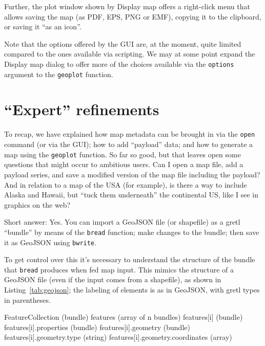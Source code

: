 \documentclass{article}
\begin{document}
Further, the plot window shown by \textsf{Display map} offers a
right-click menu that allows saving the map (as PDF, EPS, PNG or EMF),
copying it to the clipboard, or saving it ``as an icon''.

Note that the options offered by the GUI are, at the moment, quite
limited compared to the ones available via scripting. We may at some
point expand the \textsf{Display map} dialog to offer more of the
choices available via the \texttt{options} argument to the
\texttt{geoplot} function.

\section{``Expert'' refinements}
\label{sec:expert}

To recap, we have explained how map metadata can be brought in via the
\texttt{open} command (or via the GUI); how to add ``payload'' data;
and how to generate a map using the \texttt{geoplot} function. So far
so good, but that leaves open some questions that might occur to
ambitious users.  Can I open a map file, add a payload series, and
save a modified version of the map file including the payload? And in
relation to a map of the USA (for example), is there a way to include
Alaska and Hawaii, but ``tuck them underneath'' the continental US,
like I see in graphics on the web?

Short answer: Yes. You can import a GeoJSON file (or shapefile) as a
gretl ``bundle'' by means of the \texttt{bread} function; make changes
to the bundle; then save it as GeoJSON using \texttt{bwrite}.

To get control over this it's necessary to understand the structure of
the bundle that \texttt{bread} produces when fed map input. This
mimics the structure of a GeoJSON file (even if the input comes from a
shapefile), as shown in Listing~\ref{tab:geojson}; the labeling of
elements is as in GeoJSON, with gretl types in parentheses.

\begin{script}[htbp]
\begin{scode}
FeatureCollection (bundle)
  features (array of n bundles)
    features[i] (bundle)
      features[i].properties (bundle)
      features[i].geometry   (bundle)
        features[i].geometry.type (string)
        features[i].geometry.coordinates (array)
\end{scode}
  \caption{Structure of map data, gretl types in parentheses}
  \label{tab:geojson}
\end{script}
\end{document}
